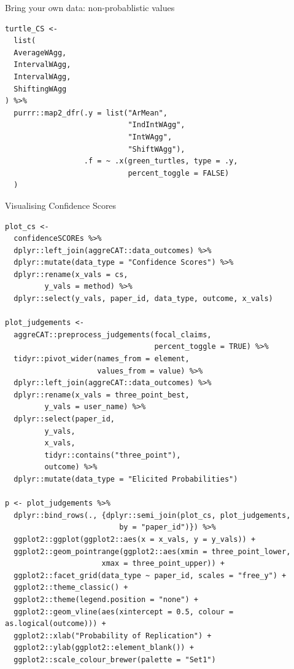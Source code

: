 \documentclass[article]{jss}
\begin{document}
\begin{codelisting}

\caption{Bring your own data: non-probablistic values}

\hypertarget{lst-BYO-data-aggregate}{%
\label{lst-BYO-data-aggregate}}%
\begin{verbatim}
turtle_CS <- 
  list(
  AverageWAgg,
  IntervalWAgg,
  IntervalWAgg,
  ShiftingWAgg
) %>%
  purrr::map2_dfr(.y = list("ArMean",
                            "IndIntWAgg",
                            "IntWAgg",
                            "ShiftWAgg"),
                  .f = ~ .x(green_turtles, type = .y,
                            percent_toggle = FALSE)
  )
\end{verbatim}

\end{codelisting}

\begin{codelisting}

\caption{Visualising Confidence Scores}

\hypertarget{lst-confidencescores}{%
\label{lst-confidencescores}}%
\begin{verbatim}
plot_cs <- 
  confidenceSCOREs %>% 
  dplyr::left_join(aggreCAT::data_outcomes) %>% 
  dplyr::mutate(data_type = "Confidence Scores") %>% 
  dplyr::rename(x_vals = cs,
         y_vals = method) %>% 
  dplyr::select(y_vals, paper_id, data_type, outcome, x_vals)

plot_judgements <- 
  aggreCAT::preprocess_judgements(focal_claims,
                                  percent_toggle = TRUE) %>% 
  tidyr::pivot_wider(names_from = element, 
                     values_from = value) %>%
  dplyr::left_join(aggreCAT::data_outcomes) %>% 
  dplyr::rename(x_vals = three_point_best,
         y_vals = user_name) %>% 
  dplyr::select(paper_id, 
         y_vals, 
         x_vals, 
         tidyr::contains("three_point"),
         outcome) %>% 
  dplyr::mutate(data_type = "Elicited Probabilities")

p <- plot_judgements %>%  
  dplyr::bind_rows(., {dplyr::semi_join(plot_cs, plot_judgements,
                          by = "paper_id")}) %>% 
  ggplot2::ggplot(ggplot2::aes(x = x_vals, y = y_vals)) +
  ggplot2::geom_pointrange(ggplot2::aes(xmin = three_point_lower, 
                      xmax = three_point_upper)) +
  ggplot2::facet_grid(data_type ~ paper_id, scales = "free_y") + 
  ggplot2::theme_classic() +
  ggplot2::theme(legend.position = "none") +
  ggplot2::geom_vline(aes(xintercept = 0.5, colour = as.logical(outcome))) +
  ggplot2::xlab("Probability of Replication") +
  ggplot2::ylab(ggplot2::element_blank()) +
  ggplot2::scale_colour_brewer(palette = "Set1")
\end{verbatim}

\end{codelisting}
\end{document}
